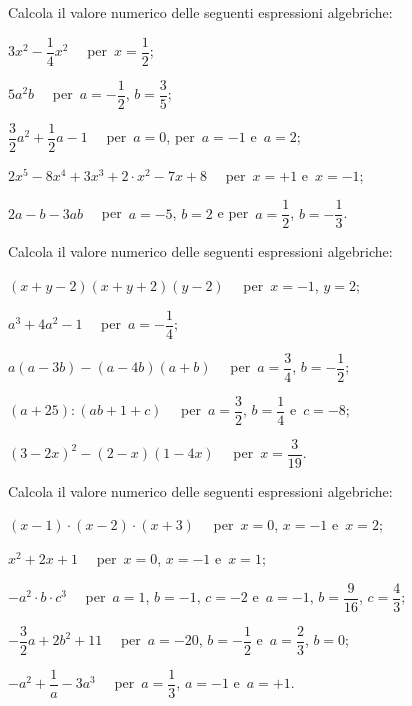 \begin{esercizio}[\Ast]
\label{ese:9.17} %
Calcola il valore numerico delle seguenti espressioni algebriche:
 \begin{enumeratea}
\spazielenx
 \item $3x^{2}-\dfrac{1}{4}x^{2}\quad$ per~$x=\dfrac{1}{2}$;
 \item $5a^{2}b\quad$ per~$a=-{\dfrac{1}{2}}$, $b=\dfrac{3}{5}$;
 \item $\dfrac{3}{2} a^{2}+\dfrac{1}{2}a-1\quad$ per~$a=0$, per~$a=-1$ e~$a=2$;
 \item $2 x^{5}-8 x^{4}+3 x^{3}+2\cdot x^{2}-7 x+8\quad$ per~$x=+1$ e~$x=-1$;
 \item $2a-b-3 ab\quad$ per~$a=-5$, $b=2$ e per~$a=\dfrac{1}{2}$, $b=-\dfrac{1}{3}$.
 \end{enumeratea}
\end{esercizio}

\begin{esercizio}[\Ast]
\label{ese:9.18} %
Calcola il valore numerico delle seguenti espressioni algebriche:
 \begin{enumeratea}
\spazielenx
 \item $(x+y-2)(x+y+2)(y-2)\quad$ per~$x=-1$, $y=2$;
 \item $a^{3}+4a^2-1\quad$ per~$a=-{\dfrac{1}{4}}$;
 \item $a(a-3b)-(a-4b)(a+b)\quad$ per~$a=\dfrac{3}{4}$, $b=-\dfrac{1}{2}$;
 \item $(a+25):(ab+1+c)\quad$ per~$a=\dfrac{3}{2}$, $b=\dfrac{1}{4}$ e~$c=-8$;
 \item $(3-2x)^2-(2-x)(1-4x)\quad$ per~$x=\dfrac{3}{19}$.
 \end{enumeratea}
\end{esercizio}

\begin{esercizio}[\Ast]
\label{ese:9.19} %
Calcola il valore numerico delle seguenti espressioni algebriche:
 \begin{enumeratea}
\spazielenx
 \item $(x-1)\cdot (x-2)\cdot (x+3)\quad$ per~$x=0$, $x= -1$ e~$x= 2$;
 \item $x^{2}+2x+1\quad$ per~$x=0$, $x= -1$ e~$x= 1$;
 \item $-a^{2}\cdot b\cdot c^{3}\quad$ per~$a=1$, $b=-1$, $c=-2$ e~$a=-1$, $b=\dfrac{9}{16}$, $c=\dfrac{4}{3}$;
 \item $-{\dfrac{3}{2}}a+2b^{2}+11\quad$ per~$a=-20$, $b=-{\dfrac{1}{2}}$ e~$a=\dfrac{2}{3}$, $b=0$;
 \item $-a^{2}+\dfrac{1}{a}-3 a^{3}\quad$ per~$a=\dfrac{1}{3}$, $a=-1$ e~$a=+1$.
 \end{enumeratea}
\end{esercizio}

